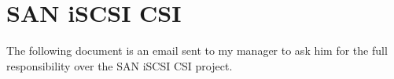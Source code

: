\chapter{SAN iSCSI CSI}


The following document is an email sent to my manager to ask him for the full responsibility over the SAN iSCSI CSI project.

\clearpage


\clearpage
